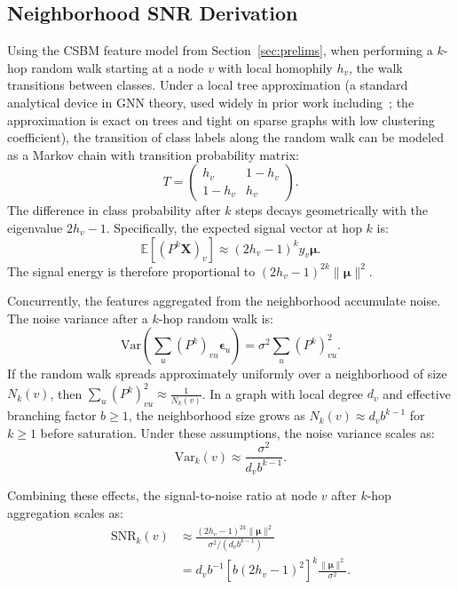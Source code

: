 \documentclass[letterpaper]{article}
\begin{document}
\subsection{Neighborhood SNR Derivation}
Using the CSBM feature model from Section~\ref{sec:prelims}, when performing a $k$-hop random walk starting at a node $v$ with local homophily $h_v$, the walk transitions between classes. Under a local tree approximation (a standard analytical device in GNN theory, used widely in prior work including~\cite{baranwal2022gcn,baranwal2023}; the approximation is exact on trees and tight on sparse graphs with low clustering coefficient), the transition of class labels along the random walk can be modeled as a Markov chain with transition probability matrix:
\begin{equation}
  T = \begin{pmatrix} h_v & 1 - h_v \\ 1 - h_v & h_v \end{pmatrix}.
\end{equation}
The difference in class probability after $k$ steps decays geometrically with the eigenvalue $2h_v - 1$. Specifically, the expected signal vector at hop $k$ is:
\begin{equation}
  \mathbb{E}[(P^k \mathbf{X})_v] \approx (2h_v - 1)^k y_v \boldsymbol\mu.
\end{equation}
The signal energy is therefore proportional to $(2h_v - 1)^{2k} \|\boldsymbol\mu\|^2$.

Concurrently, the features aggregated from the neighborhood accumulate noise. The noise variance after a $k$-hop random walk is:
\begin{equation}
  \text{Var}\left( \sum_u (P^k)_{vu} \boldsymbol\epsilon_u \right) = \sigma^2 \sum_u (P^k)_{vu}^2.
\end{equation}
If the random walk spreads approximately uniformly over a neighborhood of size $N_k(v)$, then $\sum_u (P^k)_{vu}^2 \approx \frac{1}{N_k(v)}$. In a graph with local degree $d_v$ and effective branching factor $b \geq 1$, the neighborhood size grows as $N_k(v) \approx d_v b^{k-1}$ for $k \geq 1$ before saturation. Under these assumptions, the noise variance scales as:
\begin{equation}
  \text{Var}_k(v) \approx \frac{\sigma^2}{d_v b^{k-1}}.
\end{equation}

Combining these effects, the signal-to-noise ratio at node $v$ after $k$-hop aggregation scales as:
\begin{align}
  \label{eq:snr_definition}
  \mathrm{SNR}_k(v) &\approx \frac{(2h_v - 1)^{2k} \|\boldsymbol\mu\|^2}{\sigma^2 / (d_v b^{k-1})} \nonumber \\
  &= d_v b^{-1} \left[ b (2h_v - 1)^2 \right]^k \frac{\|\boldsymbol\mu\|^2}{\sigma^2}.
\end{align}
\end{document}
